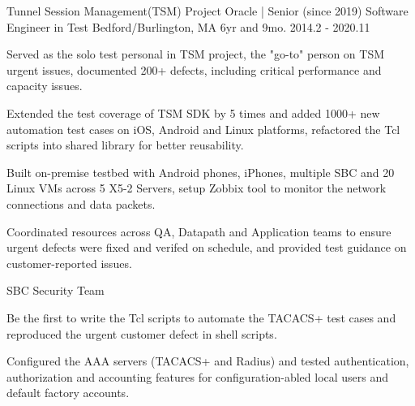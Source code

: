 


\begin{cventries}



\cventry
{Tunnel Session Management(TSM) Project} %
{Oracle | Senior (since 2019) Software Engineer in Test} %
{Bedford/Burlington, MA} %
{6yr and 9mo. 2014.2 - 2020.11} %
{ %
\begin{cvitems}
\item {Served as the solo test personal in TSM project, the "go-to" person on TSM urgent issues, documented 200+ defects, including critical performance and capacity issues.}
\item {Extended the test coverage of TSM SDK by 5 times and added 1000+ new automation test cases on iOS, Android and Linux platforms, refactored the Tcl scripts into shared library for better reusability.}
\item {Built on-premise testbed with Android phones, iPhones, multiple SBC and 20 Linux VMs across 5 X5-2 Servers, setup Zobbix tool to monitor the network connections and data packets.}
\item {Coordinated resources across QA, Datapath and Application teams to ensure urgent defects were fixed and verifed on schedule, and provided test guidance on customer-reported issues.}
\end{cvitems}
}

\cventry
{SBC Security Team} %
{} %
{} %
{} %
{ %
\begin{cvitems}
\item {Be the first to write the Tcl scripts to automate the TACACS+ test cases and reproduced the urgent customer defect in shell scripts.}
\item {Configured the AAA servers (TACACS+ and Radius) and tested authentication, authorization and accounting features for configuration-abled local users and default factory accounts.}
\end{cvitems}
}


\end{cventries}
